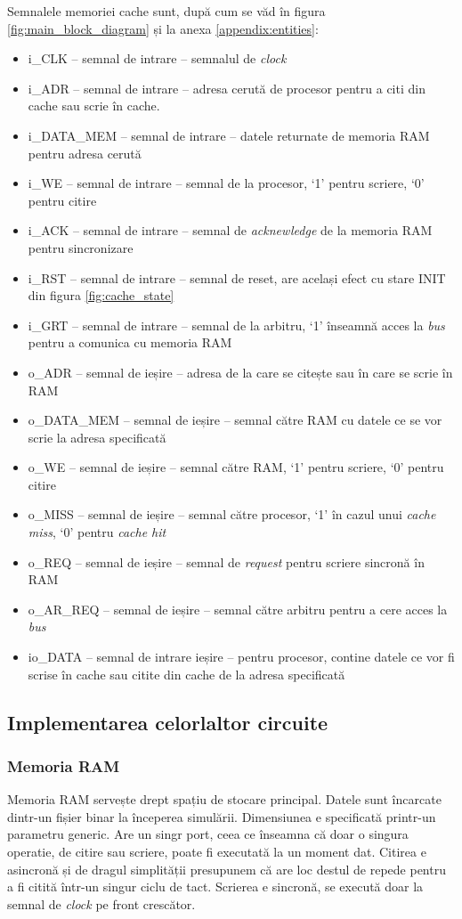 \documentclass[../main.tex]{subfiles}
\begin{document}
Semnalele memoriei cache sunt, după cum se văd în figura \ref{fig:main_block_diagram} și la anexa \ref{appendix:entities}:
\begin{itemize}
    \item i\_CLK -- semnal de intrare -- semnalul de \emph{clock}
    \item i\_ADR -- semnal de intrare -- adresa cerută de procesor pentru a citi din cache sau scrie în cache.
    \item i\_DATA\_MEM -- semnal de intrare -- datele returnate de memoria RAM pentru adresa cerută
    \item i\_WE -- semnal de intrare -- semnal de la procesor, `1' pentru scriere, `0' pentru citire
    \item i\_ACK -- semnal de intrare -- semnal de \emph{acknewledge} de la memoria RAM pentru sincronizare 
    \item i\_RST -- semnal de intrare -- semnal de reset, are același efect cu stare INIT din figura \ref{fig:cache_state}
    \item i\_GRT -- semnal de intrare -- semnal de la arbitru, `1' înseamnă acces la \emph{bus} pentru a comunica cu memoria RAM
    \item o\_ADR -- semnal de ieșire -- adresa de la care se citește sau în care se scrie în RAM
    \item o\_DATA\_MEM -- semnal de ieșire -- semnal către RAM cu datele ce se vor scrie la adresa specificată
    \item o\_WE -- semnal de ieșire -- semnal către RAM, `1' pentru scriere, `0' pentru citire
    \item o\_MISS -- semnal de ieșire -- semnal către procesor, `1' în cazul unui \emph{cache miss}, `0' pentru \emph{cache hit}
    \item o\_REQ -- semnal de ieșire -- semnal de \emph{request} pentru scriere sincronă în RAM
    \item o\_AR\_REQ -- semnal de ieșire -- semnal către arbitru pentru a cere acces la \emph{bus}
    \item io\_DATA -- semnal de intrare ieșire -- pentru procesor, contine datele ce vor fi scrise în cache sau citite din 
    cache de la adresa specificată
\end{itemize}

\subsection{Implementarea celorlaltor circuite}
\subsubsection{Memoria RAM}
Memoria RAM servește drept spațiu de stocare principal. Datele sunt încarcate dintr-un fișier binar la începerea
simulării. Dimensiunea e specificată printr-un parametru generic. Are un singr port, ceea ce înseamna că doar o
singura operatie, de citire sau scriere, poate fi executată la un moment dat. Citirea e asincronă și de dragul
simplității presupunem că are loc destul de repede pentru a fi citită într-un singur ciclu de tact. Scrierea
e sincronă, se execută doar la semnal de \emph{clock} pe front crescător.
\end{document}
